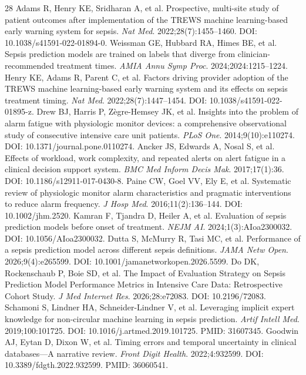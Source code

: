 \documentclass[12pt,a4paper]{article}
\begin{document}
\begin{singlespace}
\begin{thebibliography}{28}
 Adams R, Henry KE, Sridharan A, et al. Prospective, multi-site study of patient outcomes after implementation of the TREWS machine learning-based early warning system for sepsis. \textit{Nat Med}. 2022;28(7):1455--1460. DOI: 10.1038/s41591-022-01894-0.
 Weissman GE, Hubbard RA, Himes BE, et al. Sepsis prediction models are trained on labels that diverge from clinician-recommended treatment times. \textit{AMIA Annu Symp Proc}. 2024;2024:1215--1224.
 Henry KE, Adams R, Parent C, et al. Factors driving provider adoption of the TREWS machine learning-based early warning system and its effects on sepsis treatment timing. \textit{Nat Med}. 2022;28(7):1447--1454. DOI: 10.1038/s41591-022-01895-z.
 Drew BJ, Harris P, Zègre-Hemsey JK, et al. Insights into the problem of alarm fatigue with physiologic monitor devices: a comprehensive observational study of consecutive intensive care unit patients. \textit{PLoS One}. 2014;9(10):e110274. DOI: 10.1371/journal.pone.0110274.
 Ancker JS, Edwards A, Nosal S, et al. Effects of workload, work complexity, and repeated alerts on alert fatigue in a clinical decision support system. \textit{BMC Med Inform Decis Mak}. 2017;17(1):36. DOI: 10.1186/s12911-017-0430-8.
 Paine CW, Goel VV, Ely E, et al. Systematic review of physiologic monitor alarm characteristics and pragmatic interventions to reduce alarm frequency. \textit{J Hosp Med}. 2016;11(2):136--144. DOI: 10.1002/jhm.2520.
 Kamran F, Tjandra D, Heiler A, et al. Evaluation of sepsis prediction models before onset of treatment. \textit{NEJM AI}. 2024;1(3):AIoa2300032. DOI: 10.1056/AIoa2300032.
 Dutta S, McMurry R, Tasi MC, et al. Performance of a sepsis prediction model across different sepsis definitions. \textit{JAMA Netw Open}. 2026;9(4):e265599. DOI: 10.1001/jamanetworkopen.2026.5599.
 Do DK, Rockenschaub P, Boie SD, et al. The Impact of Evaluation Strategy on Sepsis Prediction Model Performance Metrics in Intensive Care Data: Retrospective Cohort Study. \textit{J Med Internet Res}. 2026;28:e72083. DOI: 10.2196/72083.
 Schamoni S, Lindner HA, Schneider-Lindner V, et al. Leveraging implicit expert knowledge for non-circular machine learning in sepsis prediction. \textit{Artif Intell Med}. 2019;100:101725. DOI: 10.1016/j.artmed.2019.101725. PMID: 31607345.
 Goodwin AJ, Eytan D, Dixon W, et al. Timing errors and temporal uncertainty in clinical databases---A narrative review. \textit{Front Digit Health}. 2022;4:932599. DOI: 10.3389/fdgth.2022.932599. PMID: 36060541.

\end{thebibliography}
\end{singlespace}
\end{document}
